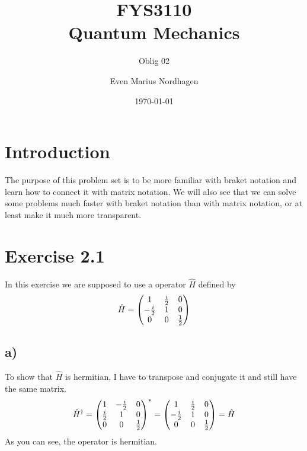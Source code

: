 \documentclass{scrartcl}
\title{FYS3110\\Quantum Mechanics}
\subtitle{Oblig 02}
\author{Even Marius Nordhagen}
\date{\today}
\begin{document}
\maketitle
\newpage
\section*{Introduction}
The purpose of this problem set is to be more familiar with braket notation and learn how to connect it with matrix notation. We will also see that we can solve some problems much faster with braket notation than with matrix notation, or at least make it much more transparent. 

\section*{Exercise 2.1}
In this exercise we are supposed to use a operator $\hat{H}$ defined by
$$\hat{H}=\mqty(1 & \frac{i}{2} & 0 \\ -\frac{i}{2} & 1 & 0 \\ 0 & 0 & \frac{1}{2})$$
\subsection*{a)}
To show that $\hat{H}$ is hermitian, I have to transpose and conjugate it and still have the same matrix.
$$\hat{H}^\dagger=\mqty(1 & -\frac{i}{2} & 0 \\ \frac{i}{2} & 1 & 0 \\ 0 & 0 & \frac{1}{2})^*=\mqty(1 & \frac{i}{2} & 0 \\ -\frac{i}{2} & 1 & 0 \\ 0 & 0 & \frac{1}{2})=\hat{H}$$
As you can see, the operator is hermitian.
\end{document}
